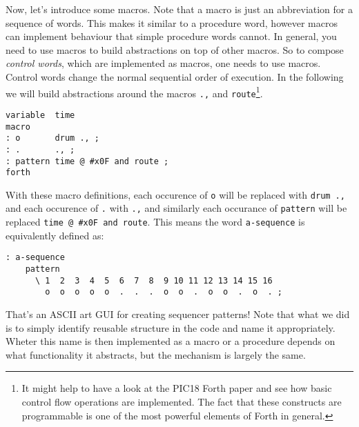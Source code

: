 \documentclass[12pt]{article}
\begin{document}
Now, let's introduce some macros. Note that a macro is just an
abbreviation for a sequence of words. This makes it similar to a
procedure word, however macros can implement behaviour that simple
procedure words cannot. In general, you need to use macros to build
abstractions on top of other macros. So to compose \emph{control
  words}, which are implemented as macros, one needs to use
macros. Control words change the normal sequential order of
execution. In the following we will build abstractions around the
macros \verb|.,| and \verb|route|\footnote{It might help to have a
  look at the PIC18 Forth paper and see how basic control flow
  operations are implemented. The fact that these constructs are
  programmable is one of the most powerful elements of Forth in
  general.}.
\begin{samepage}
\begin{verbatim}
variable  time
macro
: o       drum ., ;
: .       ., ;
: pattern time @ #x0F and route ;
forth
\end{verbatim}
\end{samepage}
With these macro definitions, each occurence of \verb|o| will be
replaced with \verb|drum .,| and each occurence of \verb|.| with
\verb|.,| and similarly each occurance of \verb|pattern| will be
replaced \verb|time @ #x0F and route|. This means the word
\verb|a-sequence| is equivalently defined as:
\begin{samepage}
\begin{verbatim}
: a-sequence 
    pattern
      \ 1  2  3  4  5  6  7  8  9 10 11 12 13 14 15 16 
        o  o  o  o  o  .  .  .  o  o  .  o  o  .  o  . ;
\end{verbatim}
\end{samepage}
That's an ASCII art GUI for creating sequencer patterns! Note that
what we did is to simply identify reusable structure in the code and
name it appropriately. Wheter this name is then implemented as a macro
or a procedure depends on what functionality it abstracts, but the
mechanism is largely the same.
\end{document}
